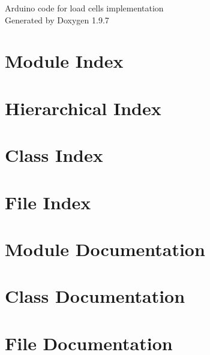 \documentclass[twoside]{book}
\newcommand{\+}{\discretionary{\mbox{\scriptsize$\hookleftarrow$}}{}{}}
\newcommand{\clearemptydoublepage}{%
    \newpage{\pagestyle{empty}\cleardoublepage}%
  }
\begin{document}
  \raggedbottom
    \hypersetup{pageanchor=false,
                bookmarksnumbered=true,
                pdfencoding=unicode
               }
  \begin{titlepage}
  \vspace*{7cm}
  \begin{center}%
  {\Large Arduino code for load cells implementation}\\
  \vspace*{1cm}
  {\large Generated by Doxygen 1.9.7}\\
  \end{center}
  \end{titlepage}
  \clearemptydoublepage
  \tableofcontents
  \clearemptydoublepage
  \hypersetup{pageanchor=true}


\chapter{Module Index}

\chapter{Hierarchical Index}

\chapter{Class Index}

\chapter{File Index}

\chapter{Module Documentation}

\chapter{Class Documentation}


\chapter{File Documentation}




  \backmatter
  \newpage
  \clearemptydoublepage
  \printindex
\end{document}
